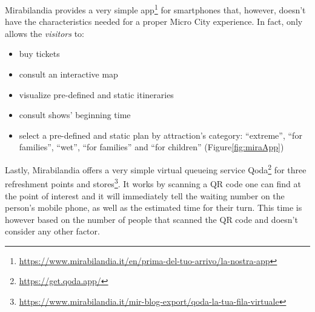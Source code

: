 Mirabilandia provides a very simple app\footnote{\url{https://www.mirabilandia.it/en/prima-del-tuo-arrivo/la-nostra-app}} for smartphones that, however, doesn't have the characteristics needed for a proper Micro City experience.
In fact, only allows the \textit{visitors} to:
\begin{itemize}
	\item buy tickets
	\item consult an interactive map
	\item visualize pre-defined and static itineraries
	\item consult shows' beginning time
	\item select a pre-defined and static plan by attraction's category: ``extreme'', ``for families'', ``wet'', ``for families'' and ``for children'' (Figure\ref{fig:miraApp})
\end{itemize}

Lastly, Mirabilandia offers a very simple virtual queueing service Qoda\footnote{\url{https://get.qoda.app/}} for three refreshment points and stores\footnote{\url{https://www.mirabilandia.it/mir-blog-export/qoda-la-tua-fila-virtuale}}.
It works by scanning a QR code one can find at the point of interest and it will immediately tell the waiting number on the person's mobile phone, as well as the estimated time for their turn.
This time is however based on the number of people that scanned the QR code and doesn't consider any other factor.

